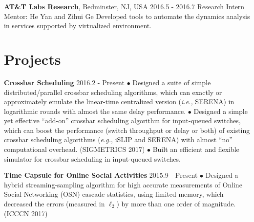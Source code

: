 \documentclass[line,11pt,letter]{F:/Dropbox (Personal)/personal-stuffs/CV/LaTeX/includes/cls/myRes}
\begin{document}
\begin{resume}
{\setlength{\parskip}{0pt}
{\bf AT\&T Labs Research}, Bedminster, NJ, USA \hfill 2016.5 - 2016.7\break
{\hspace*{1em} Research Intern \hfill Mentor: He Yan and Zihui Ge\break}
{\hspace*{1em} Developed tools to automate the dynamics analysis in services supported by virtualized environment.\break}
}\negspace
\section{Projects}
\vspace{-4pt}
{\setlength{\parskip}{0pt}
{\bf Crossbar Scheduling} \hfill 2016.2 - Present\break
{\hspace*{1em} $\bullet$ Designed a suite of simple distributed/parallel crossbar scheduling algorithms, which can exactly or approximately emulate the linear-time centralized version ({\it i.e.,} SERENA) in logarithmic rounds with almost the same delay performance.\hfill\break}
{\hspace*{1em} $\bullet$ Designed a simple yet effective ``add-on'' crossbar scheduling algorithm for input-queued switches, which can boost the performance (switch throughput or delay or both) of existing crossbar scheduling algorithms ({\it e.g.}, iSLIP and SERENA) with almost ``no'' computational overhead. (SIGMETRICS 2017)\hfill\break}
{\hspace*{1em} $\bullet$ Built an efficient and flexible simulator for crossbar scheduling in input-queued switches.\hfill\break}
\sspace

}
{\setlength{\parskip}{0pt}
{\bf Time Capsule for Online Social Activities} \hfill 2015.9 - Present\break
{\hspace*{1em} $\bullet$ Designed a hybrid streaming-sampling algorithm for high accurate measurements of Online Social Networking (OSN) cascade statistics, using limited memory, which decreased the errors (measured in $\ell_2$) by more than one order of magnitude. (ICCCN 2017)\hfill\break}
\sspace

}
\end{resume}
\end{document}
